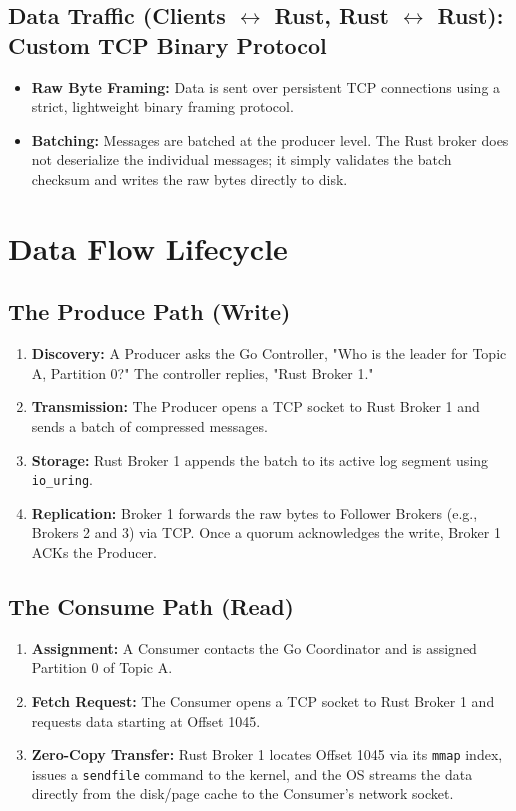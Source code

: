 \documentclass[11pt, a4paper]{article}
\begin{document}
\subsection{Data Traffic (Clients $\leftrightarrow$ Rust, Rust $\leftrightarrow$ Rust): Custom TCP Binary Protocol}
\begin{itemize}
    \item \textbf{Raw Byte Framing:} Data is sent over persistent TCP connections using a strict, lightweight binary framing protocol. 
    \item \textbf{Batching:} Messages are batched at the producer level. The Rust broker does not deserialize the individual messages; it simply validates the batch checksum and writes the raw bytes directly to disk.
\end{itemize}

\section{Data Flow Lifecycle}

\subsection{The Produce Path (Write)}
\begin{enumerate}
    \item \textbf{Discovery:} A Producer asks the Go Controller, "Who is the leader for Topic A, Partition 0?" The controller replies, "Rust Broker 1."
    \item \textbf{Transmission:} The Producer opens a TCP socket to Rust Broker 1 and sends a batch of compressed messages.
    \item \textbf{Storage:} Rust Broker 1 appends the batch to its active log segment using \texttt{io\_uring}.
    \item \textbf{Replication:} Broker 1 forwards the raw bytes to Follower Brokers (e.g., Brokers 2 and 3) via TCP. Once a quorum acknowledges the write, Broker 1 ACKs the Producer.
\end{enumerate}

\subsection{The Consume Path (Read)}
\begin{enumerate}
    \item \textbf{Assignment:} A Consumer contacts the Go Coordinator and is assigned Partition 0 of Topic A.
    \item \textbf{Fetch Request:} The Consumer opens a TCP socket to Rust Broker 1 and requests data starting at Offset 1045.
    \item \textbf{Zero-Copy Transfer:} Rust Broker 1 locates Offset 1045 via its \texttt{mmap} index, issues a \texttt{sendfile} command to the kernel, and the OS streams the data directly from the disk/page cache to the Consumer's network socket.
\end{enumerate}
\end{document}
